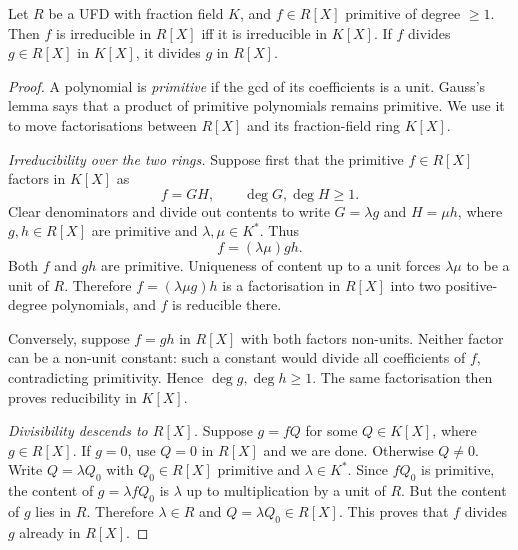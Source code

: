 \begin{proposition}\label{prop:gaussirr}
Let $R$ be a UFD with fraction field $K$, and $f\in R[X]$ primitive of degree $\ge1$. Then $f$ is irreducible in $R[X]$ iff it is irreducible in $K[X]$. If $f$ divides $g\in R[X]$ in $K[X]$, it divides $g$ in $R[X]$.
\end{proposition}
\begin{proof}
A polynomial is \emph{primitive} if the
gcd of its coefficients is a unit.
Gauss's lemma says that a product of
primitive polynomials remains primitive.
We use it to move factorisations between
$R[X]$ and its fraction-field ring $K[X]$.

\emph{Irreducibility over the two rings.}
Suppose first that the primitive
$f\in R[X]$ factors in $K[X]$ as
\[
f=GH,\qquad \deg G,\deg H\ge1.
\]
Clear denominators and divide out
contents to write $G=\lambda g$ and
$H=\mu h$, where $g,h\in R[X]$
are primitive and $\lambda,\mu\in K^*$.
Thus
\[
f=(\lambda\mu)gh.
\]
Both $f$ and $gh$ are primitive.
Uniqueness of content up to a unit
forces $\lambda\mu$ to be a unit of
$R$. Therefore
$f=(\lambda\mu g)h$ is a factorisation
in $R[X]$ into two positive-degree
polynomials, and $f$ is reducible there.

Conversely, suppose $f=gh$ in
$R[X]$ with both factors non-units.
Neither factor can be a non-unit
constant: such a constant would divide
all coefficients of $f$, contradicting
primitivity. Hence $\deg g,\deg h\ge1$.
The same factorisation then proves
reducibility in $K[X]$.

\emph{Divisibility descends to $R[X]$.}
Suppose $g=fQ$ for some $Q\in K[X]$,
where $g\in R[X]$. If $g=0$, use $Q=0$ in $R[X]$ and we are done.
Otherwise $Q\ne0$. Write $Q=\lambda Q_0$ with
$Q_0\in R[X]$ primitive and
$\lambda\in K^*$. Since $fQ_0$
is primitive, the content of
$g=\lambda fQ_0$ is $\lambda$
up to multiplication by a unit of $R$.
But the content of $g$ lies in $R$.
Therefore $\lambda\in R$ and
$Q=\lambda Q_0\in R[X]$.
This proves that $f$ divides $g$
already in $R[X]$.
\end{proof}

